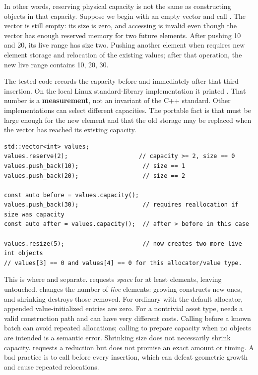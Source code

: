 In other words, reserving physical capacity is not the same as constructing objects in that capacity. Suppose we begin with an empty vector and call . The vector is still empty: its size is zero, and accessing  is invalid even though the vector has enough reserved memory for two future  elements. After pushing 10 and 20, its live range has size two. Pushing another element when  requires new element storage and relocation of the existing values; after that operation, the new live range contains 10, 20, 30.

The tested code records the capacity before and immediately after that third insertion. On the local Linux standard-library implementation it printed . That number is a \textbf{measurement}, not an invariant of the C++ standard. Other implementations can select different capacities. The portable fact is that  must be large enough for the new element and that the old storage may be replaced when the vector has reached its existing capacity.

\begin{verbatim}
std::vector<int> values;
values.reserve(2);                    // capacity >= 2, size == 0
values.push_back(10);                  // size == 1
values.push_back(20);                  // size == 2

const auto before = values.capacity();
values.push_back(30);                  // requires reallocation if size was capacity
const auto after = values.capacity();  // after > before in this case

values.resize(5);                      // now creates two more live int objects
// values[3] == 0 and values[4] == 0 for this allocator/value type.
\end{verbatim}

This is where  and  separate.  requests \emph{space} for at least  elements, leaving  untouched.  changes the number of \emph{live} elements: growing constructs new ones, and shrinking destroys those removed. For ordinary  with the default allocator, appended value-initialized entries are zero. For a nontrivial asset type,  needs a valid construction path and can have very different costs. Calling  before a known batch can avoid repeated allocations; calling  to prepare capacity when no objects are intended is a semantic error. Shrinking size does not necessarily shrink capacity.  requests a reduction but does not promise an exact amount or timing. A bad practice is to call  before every insertion, which can defeat geometric growth and cause repeated relocations.

